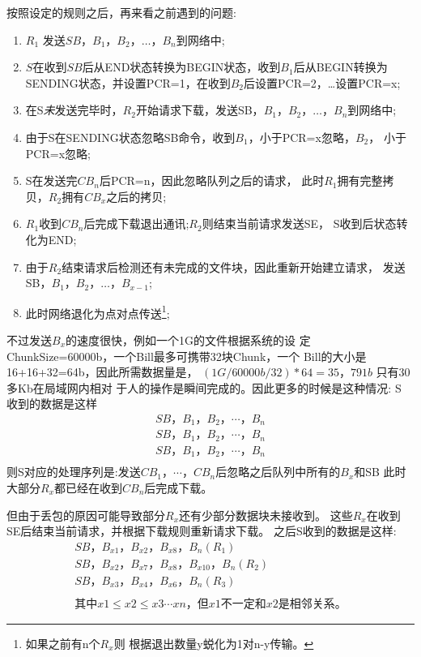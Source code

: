按照设定的规则之后，再来看之前遇到的问题:
\begin{enumerate}
	\item $R_1$ 发送$SB$，$B_1，B_2，\ldots，B_n$到网络中;
	\item $S$在收到$SB$后从END状态转换为BEGIN状态，收到$B_1$后从BEGIN转换为
		SENDING状态，并设置PCR=1，在收到$B_2$后设置PCR=2，\ldots 设置PCR=x;
	\item 在S{\em 未}发送完毕时，$R_2$开始请求下载，发送SB，$B_1，B_2，\ldots，B_n$到网络中;
	\item 由于S在SENDING状态忽略SB命令，收到$B_1$，小于PCR=x忽略，$B_2$，
		小于PCR=x忽略;
	\item S在发送完$CB_n$后PCR=n，因此忽略队列之后的请求，
		此时$R_1$拥有完整拷贝，$R_2$拥有$CB_x$之后的拷贝;
	\item $R_1$收到$CB_n$后完成下载退出通讯;$R_2$则结束当前请求发送SE，
		S收到后状态转化为END;
	\item 由于$R_2$结束请求后检测还有未完成的文件块，因此重新开始建立请求，
		发送SB，$B_1，B_2，\ldots，B_{x-1}$;
	\item 此时网络退化为点对点传送\footnote{如果之前有n个$R_x$则
		根据退出数量y蜕化为1对n-y传输。};
\end{enumerate}

不过发送$B_x$的速度很快，例如一个1G的文件根据系统的设
定ChunkSize=60000b，一个Bill最多可携带32块Chunk，一个
Bill的大小是16+16+32=64b，因此所需数据量是，
$(1G/60000b/32)*64=35，791b$ 只有30多Kb在局域网内相对
于人的操作是瞬间完成的。因此更多的时候是这种情况: S
收到的数据是这样
\begin{align*}
	SB，B_1，B_2，\cdots，B_n\\
	SB，B_1，B_2，\cdots，B_n\\
	SB，B_1，B_2，\cdots，B_n\\
\end{align*}
则S对应的处理序列是:发送$CB_1，\cdots，CB_n$后忽略之后队列中所有的$B_x$和SB
此时大部分$R_x$都已经在收到$CB_n$后完成下载。

但由于丢包的原因可能导致部分$R_x$还有少部分数据块未接收到。
这些$R_x$在收到SE后结束当前请求，并根据下载规则重新请求下载。
之后S收到的数据是这样:
\begin{align*}
	SB，B_{x1}，B_{x2}，B_{x8}，B_n         	(R_1)\\
	SB，B_{x2}，B_{x7}，B_{x8}，B_{x10}，B_n 	(R_2)\\
	SB，B_{x3}，B_{x4}，B_{x6}，B_n 			(R_3)\\
	\\
	其中x1 \leq x2 \leq x3 \cdots xn，但x1不一定和x2是相邻关系。
\end{align*}

